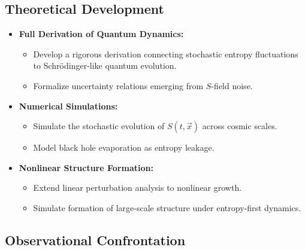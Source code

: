 \documentclass{article}
\begin{document}
\subsection{Theoretical Development}

\begin{itemize}
    \item \textbf{Full Derivation of Quantum Dynamics:}
    \begin{itemize}
        \item Develop a rigorous derivation connecting stochastic entropy fluctuations to Schrödinger-like quantum evolution.
        \item Formalize uncertainty relations emerging from $S$-field noise.
    \end{itemize}
    
    \item \textbf{Numerical Simulations:}
    \begin{itemize}
        \item Simulate the stochastic evolution of $S(t, \vec{x})$ across cosmic scales.
        \item Model black hole evaporation as entropy leakage.
    \end{itemize}
    
    \item \textbf{Nonlinear Structure Formation:}
    \begin{itemize}
        \item Extend linear perturbation analysis to nonlinear growth.
        \item Simulate formation of large-scale structure under entropy-first dynamics.
    \end{itemize}
\end{itemize}



\subsection{Observational Confrontation}
\end{document}
